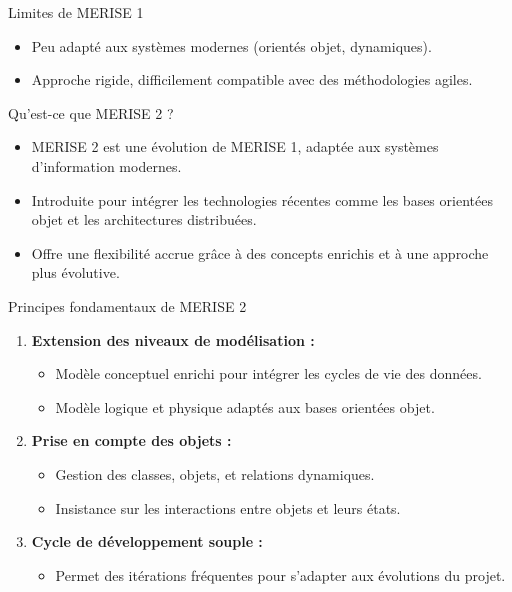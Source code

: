 \documentclass{beamer}
\begin{document}
\begin{frame}{Limites de MERISE 1}
\begin{itemize}
    \item Peu adapté aux systèmes modernes (orientés objet, dynamiques).
    \item Approche rigide, difficilement compatible avec des méthodologies agiles.
\end{itemize}
\end{frame}
\begin{frame}{Qu'est-ce que MERISE 2 ?}
\begin{itemize}
    \item MERISE 2 est une évolution de MERISE 1, adaptée aux systèmes d’information modernes.
    \item Introduite pour intégrer les technologies récentes comme les bases orientées objet et les architectures distribuées.
    \item Offre une flexibilité accrue grâce à des concepts enrichis et à une approche plus évolutive.
\end{itemize}
\end{frame}

\begin{frame}{Principes fondamentaux de MERISE 2}
\begin{enumerate}
    \item \textbf{Extension des niveaux de modélisation :}
    \begin{itemize}
        \item Modèle conceptuel enrichi pour intégrer les cycles de vie des données.
        \item Modèle logique et physique adaptés aux bases orientées objet.
    \end{itemize}
    \item \textbf{Prise en compte des objets :}
    \begin{itemize}
        \item Gestion des classes, objets, et relations dynamiques.
        \item Insistance sur les interactions entre objets et leurs états.
    \end{itemize}
    \item \textbf{Cycle de développement souple :}
    \begin{itemize}
        \item Permet des itérations fréquentes pour s’adapter aux évolutions du projet.
    \end{itemize}
\end{enumerate}
\end{frame}
\end{document}
